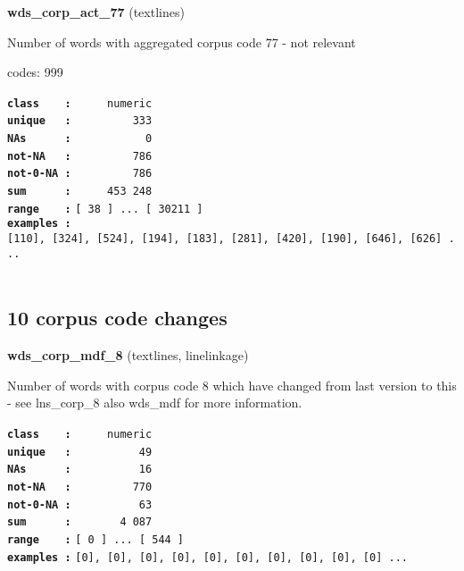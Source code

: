 \documentclass[]{article}
\begin{document}
\textbf{wds\_corp\_act\_77} (textlines)

Number of words with aggregated corpus code 77 - not relevant

codes: 999

\textbf{\texttt{class\ \ \ \ :}} \texttt{~~~~~numeric}\\
\textbf{\texttt{unique\ \ \ :}} \texttt{~~~~~~~~~333}\\
\textbf{\texttt{NAs\ \ \ \ \ \ :}} \texttt{~~~~~~~~~~~0}\\
\textbf{\texttt{not-NA\ \ \ :}} \texttt{~~~~~~~~~786}\\
\textbf{\texttt{not-0-NA\ :}} \texttt{~~~~~~~~~786}\\
\textbf{\texttt{sum\ \ \ \ \ \ :}} \texttt{~~~~~453~248}\\
\textbf{\texttt{range\ \ \ \ :}}
\texttt{{[}\ 38\ {]}\ ...\ {[}\ 30211\ {]}}\\
\textbf{\texttt{examples\ :}}
\texttt{{[}110{]},\ {[}324{]},\ {[}524{]},\ {[}194{]},\ {[}183{]},\ {[}281{]},\ {[}420{]},\ {[}190{]},\ {[}646{]},\ {[}626{]}\ ...}\\

~

\subsection{10 corpus code changes}\label{corpus-code-changes}

\textbf{wds\_corp\_mdf\_8} (textlines, linelinkage)

Number of words with corpus code 8 which have changed from last version
to this - see lns\_corp\_8 also wds\_mdf for more information.

\textbf{\texttt{class\ \ \ \ :}} \texttt{~~~~~numeric}\\
\textbf{\texttt{unique\ \ \ :}} \texttt{~~~~~~~~~~49}\\
\textbf{\texttt{NAs\ \ \ \ \ \ :}} \texttt{~~~~~~~~~~16}\\
\textbf{\texttt{not-NA\ \ \ :}} \texttt{~~~~~~~~~770}\\
\textbf{\texttt{not-0-NA\ :}} \texttt{~~~~~~~~~~63}\\
\textbf{\texttt{sum\ \ \ \ \ \ :}} \texttt{~~~~~~~4~087}\\
\textbf{\texttt{range\ \ \ \ :}}
\texttt{{[}\ 0\ {]}\ ...\ {[}\ 544\ {]}}\\
\textbf{\texttt{examples\ :}}
\texttt{{[}0{]},\ {[}0{]},\ {[}0{]},\ {[}0{]},\ {[}0{]},\ {[}0{]},\ {[}0{]},\ {[}0{]},\ {[}0{]},\ {[}0{]}\ ...}\\
\end{document}
